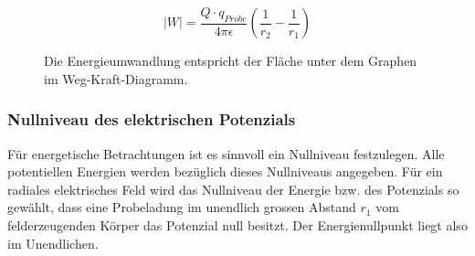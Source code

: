 \documentclass[11pt,twoside=false,open=any]{scrbook}
\begin{document}
\begin{equation}
\left| W \right| = \frac{Q \cdot q_{Probe}}{4 \pi \epsilon} ( \frac{1}{r_{2}} - \frac{1}{r_{1}})
\label{energieradialfeld}
\end{equation}

\begin{figure}[h]
\begin{center}
\caption{Die Energieumwandlung entspricht der Fläche unter dem Graphen im Weg-Kraft-Diagramm.}
\label{Energieumwandlung}
\end{center}
\end{figure}

\subsubsection{Nullniveau des elektrischen Potenzials}
Für energetische Betrachtungen ist es sinnvoll ein Nullniveau festzulegen. Alle potentiellen Energien werden bezüglich dieses Nullniveaus angegeben. Für ein radiales elektrisches Feld wird das Nullniveau der Energie bzw. des Potenzials so gewählt, dass eine Probeladung im unendlich grossen Abstand $r_{1}$ vom felderzeugenden Körper das Potenzial null besitzt. Der Energienullpunkt liegt also im Unendlichen. 

\begin{center}
   \setlength{\fboxrule}{2pt}
\end{center}
\end{document}
